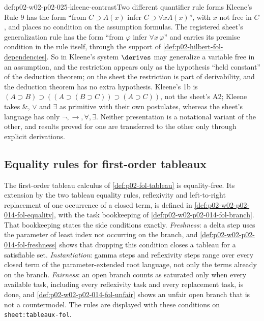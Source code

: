 \begin{hbwarning}{def:p02-w02-p02-025-kleene-contrast}{Two different quantifier rule forms}
Kleene's Rule 9 has the form ``from \(C\supset A(x)\) infer
\(C\supset\forall xA(x)\)'', with \(x\) not free in \(C\), and places no
condition on the assumption formulas.  The registered sheet's generalization
rule has the form ``from \(\varphi\) infer \(\forall x\,\varphi\)'' and
carries its premise condition in the rule itself, through the support of
\cref{def:p02-hilbert-fol-dependencies}.  So in Kleene's system
\(\derives\) may generalize a variable free in an assumption, and the
restriction appears only as the hypothesis ``held constant'' of the
deduction theorem; on the sheet the restriction is part of
derivability, and the deduction theorem has no extra hypothesis.  Kleene's
1b is \((A\supset B)\supset((A\supset(B\supset C))\supset(A\supset C))\),
not the sheet's A2; Kleene takes \(\mathbin{\&}\), \(\lor\) and \(\exists\) as
primitive with their own postulates, whereas the sheet's language has only
\(\neg,\to,\forall,\exists\).  Neither presentation is a notational variant
of the other, and results proved for one are transferred to the other only
through explicit derivations.
\end{hbwarning}

\subsection{Equality rules for first-order tableaux}
\label{sec:p02-w02-p02-025-tableau-equality}

The first-order tableau calculus of \cref{def:p02-fol-tableau} is
equality-free.  Its extension by the two tableau equality rules, reflexivity
and left-to-right replacement of one occurrence of a closed term, is defined
in \cref{def:p02-w02-p02-014-fol-equality}, with the task bookkeeping of
\cref{def:p02-w02-p02-014-fol-branch}.  That bookkeeping states the
side conditions exactly.  \emph{Freshness}: a delta step uses the parameter
of least index not occurring on the branch, and
\cref{def:p02-w02-p02-014-fol-freshness} shows that dropping this condition
closes a tableau for a satisfiable set.  \emph{Instantiation}: gamma steps and
reflexivity steps range over every closed term of the parameter-extended root
language, not only the terms already on the branch.  \emph{Fairness}: an
open branch counts as saturated only when every available task, including
every reflexivity task and every replacement task, is done, and
\cref{def:p02-w02-p02-014-fol-unfair} shows an unfair open branch that is
not a countermodel.  The rules are displayed with these conditions on
\texttt{sheet:\allowbreak tableaux-fol}.

